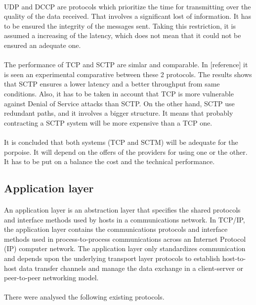 \paragraph{}
UDP and DCCP are protocols which prioritize the time for transmitting over the quality of the data received. That involves a significant lost of information. It has to be ensured the integrity of the messages sent. Taking this restriction, it is assumed a increasing of the latency, which does not mean that it could not be ensured an adequate one.
\paragraph{}
The performance of TCP and SCTP are simlar and comparable. In [reference] it is seen an experimental comparative between these 2 protocols. The results shows that SCTP ensures a lower latency and a better throughput from same conditions. Also, it has to be taken in account that TCP is more vulnerable against Denial of Service attacks than SCTP. On the other hand, SCTP use redundant paths, and it involves a bigger structure. It means that probably contracting a SCTP system will be more expensive than a TCP one. 
\paragraph{}
It is concluded that both systems (TCP and SCTM) will be adequate for the porpoise. It will depend on the offers of the providers for using one or the other. It has to be put on a balance the cost and the technical performance.

\subsection{Application layer}
\paragraph{}
An application layer is an abstraction layer that specifies the shared protocols and interface methods used by hosts in a communications network. In TCP/IP, the application layer contains the communications protocols and interface methods used in process-to-process communications across an Internet Protocol (IP) computer network. The application layer only standardizes communication and depends upon the underlying transport layer protocols to establish host-to-host data transfer channels and manage the data exchange in a client-server or peer-to-peer networking model. 
\paragraph{}
There were analysed the following existing protocols.

